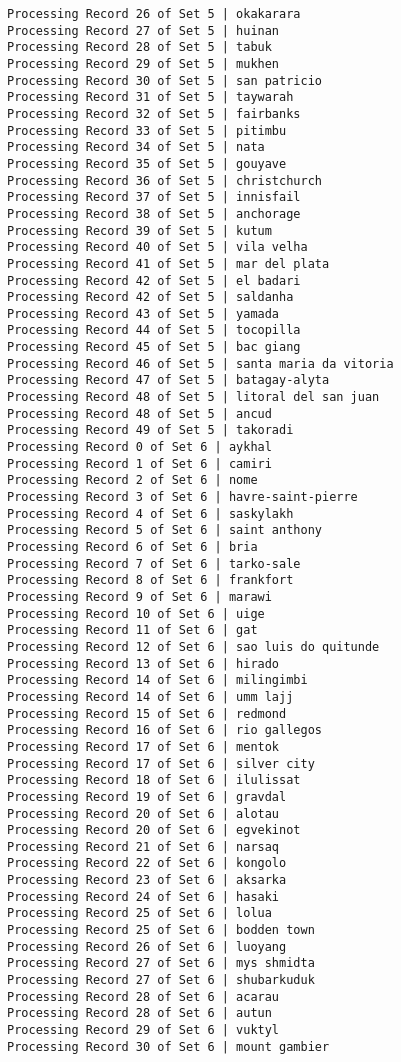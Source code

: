 \documentclass[11pt]{article}
\begin{document}
\begin{Verbatim}[commandchars=\\\{\}]
Processing Record 26 of Set 5 | okakarara
Processing Record 27 of Set 5 | huinan
Processing Record 28 of Set 5 | tabuk
Processing Record 29 of Set 5 | mukhen
Processing Record 30 of Set 5 | san patricio
Processing Record 31 of Set 5 | taywarah
Processing Record 32 of Set 5 | fairbanks
Processing Record 33 of Set 5 | pitimbu
Processing Record 34 of Set 5 | nata
Processing Record 35 of Set 5 | gouyave
Processing Record 36 of Set 5 | christchurch
Processing Record 37 of Set 5 | innisfail
Processing Record 38 of Set 5 | anchorage
Processing Record 39 of Set 5 | kutum
Processing Record 40 of Set 5 | vila velha
Processing Record 41 of Set 5 | mar del plata
Processing Record 42 of Set 5 | el badari
Processing Record 42 of Set 5 | saldanha
Processing Record 43 of Set 5 | yamada
Processing Record 44 of Set 5 | tocopilla
Processing Record 45 of Set 5 | bac giang
Processing Record 46 of Set 5 | santa maria da vitoria
Processing Record 47 of Set 5 | batagay-alyta
Processing Record 48 of Set 5 | litoral del san juan
Processing Record 48 of Set 5 | ancud
Processing Record 49 of Set 5 | takoradi
Processing Record 0 of Set 6 | aykhal
Processing Record 1 of Set 6 | camiri
Processing Record 2 of Set 6 | nome
Processing Record 3 of Set 6 | havre-saint-pierre
Processing Record 4 of Set 6 | saskylakh
Processing Record 5 of Set 6 | saint anthony
Processing Record 6 of Set 6 | bria
Processing Record 7 of Set 6 | tarko-sale
Processing Record 8 of Set 6 | frankfort
Processing Record 9 of Set 6 | marawi
Processing Record 10 of Set 6 | uige
Processing Record 11 of Set 6 | gat
Processing Record 12 of Set 6 | sao luis do quitunde
Processing Record 13 of Set 6 | hirado
Processing Record 14 of Set 6 | milingimbi
Processing Record 14 of Set 6 | umm lajj
Processing Record 15 of Set 6 | redmond
Processing Record 16 of Set 6 | rio gallegos
Processing Record 17 of Set 6 | mentok
Processing Record 17 of Set 6 | silver city
Processing Record 18 of Set 6 | ilulissat
Processing Record 19 of Set 6 | gravdal
Processing Record 20 of Set 6 | alotau
Processing Record 20 of Set 6 | egvekinot
Processing Record 21 of Set 6 | narsaq
Processing Record 22 of Set 6 | kongolo
Processing Record 23 of Set 6 | aksarka
Processing Record 24 of Set 6 | hasaki
Processing Record 25 of Set 6 | lolua
Processing Record 25 of Set 6 | bodden town
Processing Record 26 of Set 6 | luoyang
Processing Record 27 of Set 6 | mys shmidta
Processing Record 27 of Set 6 | shubarkuduk
Processing Record 28 of Set 6 | acarau
Processing Record 28 of Set 6 | autun
Processing Record 29 of Set 6 | vuktyl
Processing Record 30 of Set 6 | mount gambier

\end{Verbatim}
\end{document}
